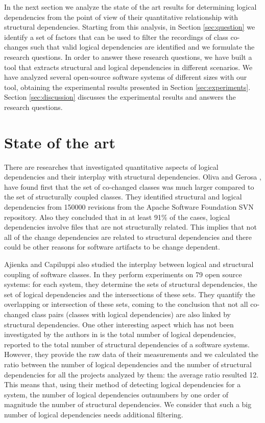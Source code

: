 \documentclass[a4paper,twoside]{article}
\begin{document}
In the next section we analyze the state of the art results for determining logical dependencies from the point of view of their quantitative relationship with structural dependencies. Starting from this analysis, in Section \ref{sec:question} we identify a set of factors that can be used to filter the recordings of class co-changes such that valid logical dependencies are identified and we formulate the research questions. In order to answer these research questions, we have built a tool that extracts structural and logical dependencies in different scenarios. We have analyzed several open-source software systems of different sizes with our tool, obtaining the experimental results presented in Section \ref{sec:experiments}. Section \ref{sec:discussion} discusses the experimental results and answers the research questions.
 


\section{State of the art}
\label{sec:state}


There are researches that investigated quantitative aspects of logical dependencies and their interplay with structural dependencies. 
Oliva and Gerosa \cite{Oliva:2011:ISL:2067853.2068086}, \cite{DBLP:conf/issre/OlivaG15} have found first that the set of co-changed classes was much larger compared to the set of structurally coupled classes. They identified structural and logical dependencies from 150000 revisions from the Apache Software Foundation SVN repository. Also they concluded  that in at least 91\% of the cases, logical dependencies involve files that are not structurally related. This implies that not all of the change dependencies are related to structural dependencies and there could be other reasons for software artifacts to be change dependent.

Ajienka and Capiluppi also studied the interplay between logical and structural coupling of software classes. In \cite{DBLP:journals/jss/AjienkaC17} they  perform experiments on 79 open source systems: for each system, they determine the sets of structural dependencies, the set of logical dependencies and the intersections of these sets. They quantify the overlapping or intersection of these sets, coming to the conclusion that not all co-changed class pairs (classes with logical dependencies) are also linked by structural dependencies. One other interesting aspect which has not been investigated by the authors in \cite{DBLP:journals/jss/AjienkaC17}  is the total number of logical dependencies, reported to the total number of structural dependencies of a software systems. However, they provide the raw data of their measurements and we calculated the ratio between the number of logical dependencies and the number of structural dependencies for all the projects analyzed by them: the average ratio resulted 12.  This means that, using their method of detecting logical dependencies for a system, the number of logical dependencies outnumbers by one order of magnitude the number of structural dependencies. We consider that such a big number of logical dependencies needs additional filtering. 
\end{document}
